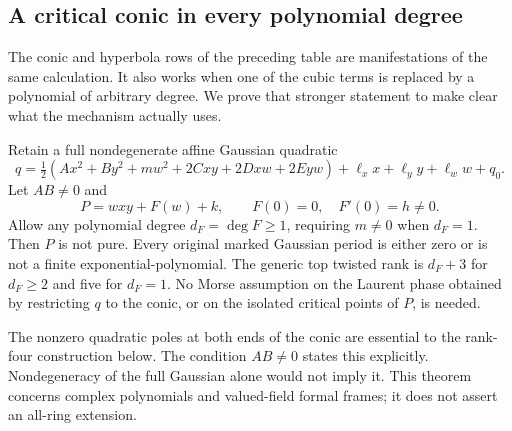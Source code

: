 \subsection{A critical conic in every polynomial degree}
\label{sec:hyperbolicsuspension}

The conic and hyperbola rows of the preceding table are manifestations
of the same calculation. It also works when one of the cubic terms is
replaced by a polynomial of arbitrary degree. We prove that stronger
statement to make clear what the mechanism actually uses.

\begin{theorem}\label{thm:hyperbolicsuspension}
Retain a full nondegenerate affine Gaussian quadratic
\[
 q=\tfrac12(Ax^2+By^2+mw^2+2Cxy+2Dxw+2Eyw)
                     +\ell_x x+\ell_y y+\ell_w w+q_0.
\]
Let $AB\ne0$ and
\[
 P=wxy+F(w)+k,\qquad F(0)=0,\quad F'(0)=h\ne0.
\]
Allow any polynomial degree $d_F=\deg F\ge1$, requiring $m\ne0$
when $d_F=1$. Then $P$ is not pure. Every original marked Gaussian
period is either zero or is not a finite exponential-polynomial.
The generic top twisted rank is $d_F+3$ for $d_F\ge2$ and five for
$d_F=1$. No Morse assumption on the Laurent phase obtained by
restricting $q$ to the conic, or on the isolated critical points of
$P$, is needed.
\end{theorem}

The nonzero quadratic poles at both ends of the conic are essential
to the rank-four construction below. The condition $AB\ne0$ states
this explicitly. Nondegeneracy of the full Gaussian alone would not
imply it. This theorem concerns complex polynomials and valued-field
formal frames; it does not assert an all-ring extension.

